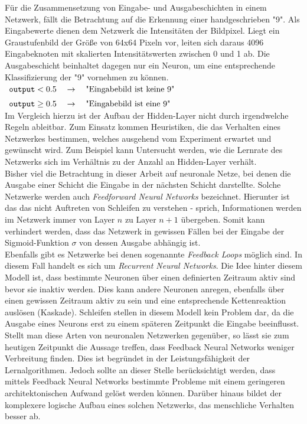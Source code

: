 \noindent
Für die Zusammensetzung von Eingabe- und Ausgabeschichten in einem Netzwerk, fällt die Betrachtung auf die Erkennung einer handgeschrieben "9". Als Eingabewerte dienen dem Netzwerk die Intensitäten der Bildpixel. Liegt ein Graustufenbild der Größe von 64x64 Pixeln vor, leiten sich daraus 4096 Eingabeknoten  mit skalierten Intensitätswerten zwischen 0 und 1 ab. Die Ausgabeschicht beinhaltet dagegen nur ein Neuron, um eine entsprechende Klassifizierung der "9" vornehmen zu können. \\[0.2cm]
\hspace*{1.3cm}
$ 
\begin{array}[t]{lcll}
	\mathtt{output} < 0.5 \quad\rightarrow\quad \mbox{"Eingabebild ist keine 9"} \\[0.2cm]
	\mathtt{output} \geq 0.5 \quad\rightarrow\quad \mbox{"Eingabebild ist eine 9"}
\end{array}
$
\\[0.2cm]
Im Vergleich hierzu ist der Aufbau der Hidden-Layer nicht durch irgendwelche Regeln ableitbar. Zum Einsatz kommen Heuristiken, die das Verhalten eines Netzwerkes bestimmen, welches ausgehend vom Experiment erwartet und gewünscht wird. Zum Beispiel kann Untersucht werden, wie die Lernrate des Netzwerks sich im Verhältnis zu der Anzahl an Hidden-Layer verhält. \\

\noindent
Bisher viel die Betrachtung in dieser Arbeit auf neuronale Netze, bei denen die Ausgabe einer Schicht die Eingabe in der nächsten Schicht darstellte. Solche Netzwerke werden auch \textit{Feedforward Neural Networks} bezeichnet. Hierunter ist das das nicht Auftreten von Schleifen zu verstehen - sprich, Informationen werden im Netzwerk immer von Layer $n$ zu Layer $n+1$ übergeben. Somit kann verhindert werden, dass das Netzwerk in gewissen Fällen bei der Eingabe der Sigmoid-Funktion $\sigma$ von dessen Ausgabe abhängig ist. \\
Ebenfalls gibt es Netzwerke bei denen sogenannte \textit{Feedback Loops} möglich sind. In diesem Fall handelt es sich um \textit{Recurrent Neural Networks}. Die Idee hinter diesem Modell ist, dass bestimmte Neuronen über einen definierten Zeitraum aktiv sind bevor sie inaktiv werden. Dies kann andere Neuronen anregen, ebenfalls über einen gewissen Zeitraum aktiv zu sein und eine entsprechende Kettenreaktion auslösen (Kaskade). Schleifen stellen in diesem Modell kein Problem dar, da die Ausgabe eines Neurons erst zu einem späteren Zeitpunkt die Eingabe beeinflusst. \\
Stellt man diese Arten von neuronalen Netzwerken gegenüber, so lässt sie zum heutigen Zeitpunkt die Aussage treffen, dass Feedback Neural Networks weniger Verbreitung finden. Dies ist begründet in der Leistungsfähigkeit der Lernalgorithmen. Jedoch sollte an dieser Stelle berücksichtigt werden, dass mittels Feedback Neural Networks bestimmte Probleme mit einem geringeren architektonischen Aufwand gelöst werden können. Darüber hinaus bildet der komplexere logische Aufbau eines solchen Netzwerks, das menschliche Verhalten besser ab.

